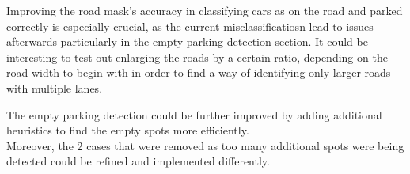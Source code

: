 Improving the road mask's accuracy in classifying cars as on the road and parked correctly is especially crucial, as the current misclassificatiosn lead to issues afterwards particularly in the empty parking detection section.
It could be interesting to test out enlarging the roads by a certain ratio, depending on the road width to begin with in order to find a way of identifying only larger roads with multiple lanes.

The empty parking detection could be further improved by adding additional heuristics to find the empty spots more efficiently.\\
Moreover, the 2 cases that were removed as too many additional spots were being detected could be refined and implemented differently.